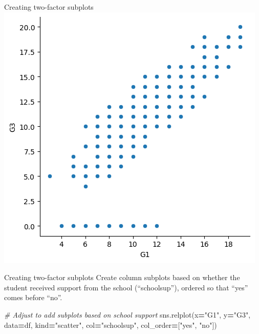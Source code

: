 \documentclass[
  ignorenonframetext,
]{beamer}
\newenvironment{Shaded}{\begin{snugshade}}{\end{snugshade}}
\newcommand{\CommentTok}[1]{\textcolor[rgb]{0.56,0.35,0.01}{\textit{#1}}}
\newcommand{\NormalTok}[1]{#1}
\newcommand{\OperatorTok}[1]{\textcolor[rgb]{0.81,0.36,0.00}{\textbf{#1}}}
\newcommand{\StringTok}[1]{\textcolor[rgb]{0.31,0.60,0.02}{#1}}
\begin{document}
\begin{frame}{Creating two-factor subplots}
\label{creating-two-factor-subplots-4}
\includegraphics{../images/im265.png}
\end{frame}

\begin{frame}[fragile]{Creating two-factor subplots}
\label{creating-two-factor-subplots-5}
Create column subplots based on whether the student received support
from the school (``schoolsup''), ordered so that ``yes'' comes before
``no''.


\begin{Shaded}
\begin{Highlighting}[]
\CommentTok{\# Adjust to add subplots based on school support}
\NormalTok{sns.relplot(x}\OperatorTok{=}\StringTok{"G1"}\NormalTok{, y}\OperatorTok{=}\StringTok{"G3"}\NormalTok{, }
\NormalTok{            data}\OperatorTok{=}\NormalTok{df,}
\NormalTok{            kind}\OperatorTok{=}\StringTok{"scatter"}\NormalTok{, }
\NormalTok{            col}\OperatorTok{=}\StringTok{"schoolsup"}\NormalTok{,}
\NormalTok{            col\_order}\OperatorTok{=}\NormalTok{[}\StringTok{"yes"}\NormalTok{, }\StringTok{"no"}\NormalTok{])}
\end{Highlighting}
\end{Shaded}
\end{frame}
\end{document}
